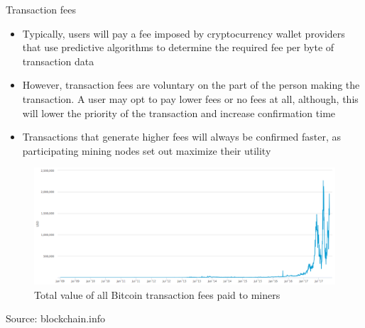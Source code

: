 \documentclass[11pt]{beamer}
\begin{document}
\begin{frame}{Transaction fees}
	\begin{itemize}
		\item Typically, users will pay a fee imposed by cryptocurrency wallet providers that use predictive algorithms to determine the required fee per byte of transaction data
		\item However, transaction fees are voluntary on the part of the person making the transaction. A user may opt to pay lower fees or no fees at all, although, this will lower the priority of the transaction and increase confirmation time
		\item Transactions that generate higher fees will always be confirmed faster, as participating mining nodes set out maximize their utility
	\end{itemize}
\end{frame}


\begin{frame}
	\begin{scriptsize}
	\end{scriptsize}
	\begin{figure}[]
		\centering
		\includegraphics  [scale=0.25]{Images/transaction-fees}
		\caption{	Total value of all Bitcoin transaction fees paid to miners}
	\end{figure}
	\begin{tiny}
		Source: blockchain.info
	\end{tiny}
\end{frame}

\end{document}
